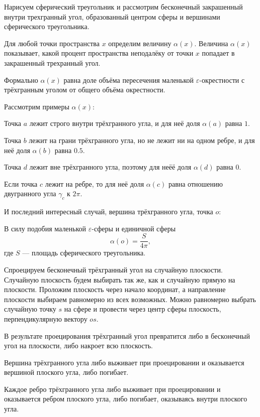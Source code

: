 \documentclass[12pt]{article} %
\theoremstyle{definition} %
\begin{document}
Нарисуем сферический треугольник и рассмотрим бесконечный закрашенный внутри трехгранный угол, 
образованный центром сферы и вершинами сферического треугольника. 


Для любой точки пространства $x$ определим величину $\alpha(x)$. 
Величина $\alpha(x)$ показывает, какой процент пространства неподалёку от точки $x$ попадает в закрашенный трехранный угол.

Формально $\alpha(x)$ равна доле объёма пересечения маленькой $\varepsilon$-окрестности 
с трёхгранным уголом от общего объёма окрестности. 

Рассмотрим примеры $\alpha(x)$:


Точка $a$ лежит строго внутри трёхгранного угла, 
и для неё доля $\alpha(a)$ равна $1$.

Точка $b$ лежит на грани трёхгранного угла, 
но не лежит ни на одном ребре, 
и для неё доля $\alpha(b)$ равна $0.5$.

Точка $d$ лежит вне трёхгранного угла, 
поэтому для неёё доля $\alpha(d)$ равна $0$.

Если точка $c$ лежит на ребре, то для неё доля $\alpha(c)$
равна отношению двугранного угла $\gamma_c$ к $2\pi$.


И последний интересный случай, вершина трёхгранного угла, точка $o$:


В силу подобия маленькой $\varepsilon$-сферы и единичной сферы
\[
\alpha(o) = \frac{S}{4\pi},
\]
где $S$ — площадь сферического треугольника. 

Спроецируем бесконечный трёхгранный угол на случайную плоскости. 
Случайную плоскость будем выбирать так же, как и случайную прямую на плоскости. 
Проложим плоскость через начало координат, а направление плоскости выбираем равномерно из всех возможных. 
Можно равномерно выбрать случайную точку $s$ на сфере и провести 
через центр сферы плоскость, перпендикулярную вектору $os$.

В результате проецирования трёхгранный угол превратится 
либо в бесконечный угол на плоскости, либо накроет всю плоскость. 


Вершина трёхгранного угла либо выживает при проецировании и оказывается вершиной плоского угла, либо погибает. 

Каждое ребро трёхгранного угла либо выживает при проецировании и оказывается ребром плоского угла, либо погибает, оказываясь внутри плоского угла. 
\end{document}
